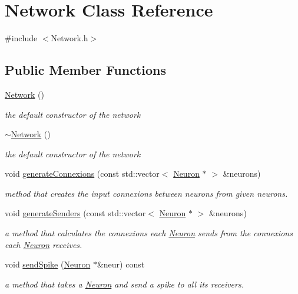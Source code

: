 \hypertarget{classNetwork}{}\section{Network Class Reference}
\label{classNetwork}


{\ttfamily \#include $<$Network.\+h$>$}

\subsection*{Public Member Functions}
\begin{DoxyCompactItemize}
\item 
\hyperlink{classNetwork_a3cc2fb4f8fa4d507077e8da85ce5a1c8}{Network} ()
\begin{DoxyCompactList}\small\item\em the default constructor of the network \end{DoxyCompactList}\item 
\hyperlink{classNetwork_a7a4e19cdb4bf0c7ecf82baa643831492}{$\sim$\+Network} ()
\begin{DoxyCompactList}\small\item\em the default constructor of the network \end{DoxyCompactList}\item 
void \hyperlink{classNetwork_ad8b5ad511556baadcbc557f3e7beff69}{generate\+Connexions} (const std\+::vector$<$ \hyperlink{classNeuron}{Neuron} $\ast$ $>$ \&neurons)
\begin{DoxyCompactList}\small\item\em method that creates the input connexions between neurons from given neurons. \end{DoxyCompactList}\item 
void \hyperlink{classNetwork_a99a198d49d4b4c6ea2c247264ff774ea}{generate\+Senders} (const std\+::vector$<$ \hyperlink{classNeuron}{Neuron} $\ast$ $>$ \&neurons)
\begin{DoxyCompactList}\small\item\em a method that calculates the connexions each \hyperlink{classNeuron}{Neuron} sends from the connexions each \hyperlink{classNeuron}{Neuron} receives. \end{DoxyCompactList}\item 
void \hyperlink{classNetwork_a8c444d79895bee27bff94aa47bb45733}{send\+Spike} (\hyperlink{classNeuron}{Neuron} $\ast$\&neur) const 
\begin{DoxyCompactList}\small\item\em a method that takes a \hyperlink{classNeuron}{Neuron} and send a spike to all its receivers. \end{DoxyCompactList}\end{DoxyCompactItemize}


